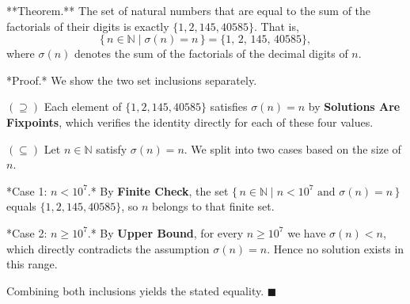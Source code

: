 **Theorem.** The set of natural numbers that are equal to the sum of the factorials of their digits is exactly $\{1, 2, 145, 40585\}$. That is,
$$\{\, n \in \mathbb{N} \mid \sigma(n) = n \,\} = \{1,\, 2,\, 145,\, 40585\},$$
where $\sigma(n)$ denotes the sum of the factorials of the decimal digits of $n$.

*Proof.* We show the two set inclusions separately.

$(\supseteq)$ Each element of $\{1, 2, 145, 40585\}$ satisfies $\sigma(n) = n$ by \textbf{Solutions Are Fixpoints}, which verifies the identity directly for each of these four values.

$(\subseteq)$ Let $n \in \mathbb{N}$ satisfy $\sigma(n) = n$. We split into two cases based on the size of $n$.

*Case 1: $n < 10^7$.* By \textbf{Finite Check}, the set $\{\, n \in \mathbb{N} \mid n < 10^7 \text{ and } \sigma(n) = n \,\}$ equals $\{1, 2, 145, 40585\}$, so $n$ belongs to that finite set.

*Case 2: $n \geq 10^7$.* By \textbf{Upper Bound}, for every $n \geq 10^7$ we have $\sigma(n) < n$, which directly contradicts the assumption $\sigma(n) = n$. Hence no solution exists in this range.

Combining both inclusions yields the stated equality. $\blacksquare$